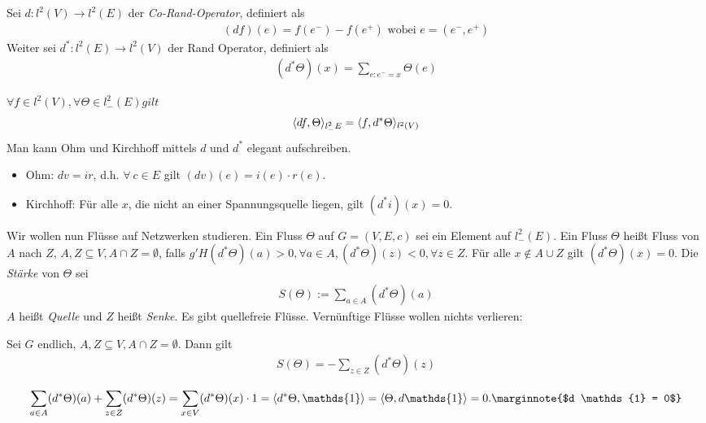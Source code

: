 \begin{definition}
	Sei $d:l^2(V) \to l^2(E)$ der \emph{Co-Rand-Operator}, definiert als
	\begin{gather}
		(df)(e) =  f(e^-) - f(e^+) \text{ wobei } e= (e^-,e^+)
	\end{gather}
	Weiter sei $d^*: l^2(E) \to l^2(V)$ der Rand Operator, definiert als
	\begin{gather}
		(d^*\Theta)(x) = \sum\limits_{e:e^-=x} \Theta(e)
	\end{gather}
\end{definition}
\begin{uebung}
	$\forall f \in l^2(V), \forall \Theta \in l^2_-(E)gilt$
	\begin{gather}
		\langle df,\Theta\rangle_{l^2_-E} = \langle f,d^*\Theta\rangle_{l^2(V)}
	\end{gather}
	Man kann Ohm und Kirchhoff mittels $d$ und $d^*$ elegant aufschreiben.
	\begin{itemize}
		\item Ohm: $dv = ir$, d.h. $\forall \ c \in E$ gilt $(dv)(e) = i(e) \cdot r(e)$.
		\item Kirchhoff: Für alle $x$, die nicht an einer Spannungsquelle liegen, gilt $(d^*i)(x)= 0$.
	\end{itemize}
\end{uebung}
Wir wollen nun Flüsse auf Netzwerken studieren. Ein Fluss $\Theta$ auf $G = (V,E,c)$ sei ein Element auf $l^2_-(E)$. Ein Fluss $\Theta$ heißt Fluss von $A$ nach $Z$, $A,Z \subseteq V, A \cap Z = \emptyset$, falls $g'H (d^*\Theta)(a) > 0, \forall a\in A , (d^*\Theta)(z)<0, \forall z \in Z$. Für alle $x \notin A\cup Z$ gilt $(d^*\Theta)(x) = 0$. Die \emph{Stärke} von $\Theta$ sei 
\begin{gather}
	S(\Theta) :=\sum\limits_{a \in A}(d^*\Theta)(a)
\end{gather}
$A$ heißt \emph{Quelle} und $Z$ heißt \emph{Senke}. Es gibt quellefreie  Flüsse. Vernünftige Flüsse wollen nichts verlieren:
\begin{lemma}
	Sei $G$ endlich, $A,Z \subseteq V, A \cap Z = \emptyset$. Dann gilt 
	\begin{align}
		S(\Theta) = -\sum\limits_{z \in Z}(d^*\Theta)(z)
	\end{align}
\end{lemma}
\begin{beweis}
	\begin{gather}
		\sum\limits_{a \in A} (d^*\Theta)(a) + \sum\limits_{z \in Z} (d^*\Theta)(z) = \sum\limits_{x \in V}(d^*\Theta)(x) \cdot 1 = \sprod{d^*\Theta,\mathds{1}} = \sprod{\Theta,d \mathds{1}} = 0. \marginnote{$d \mathds{1} = 0$}
	\end{gather}
\end{beweis}

